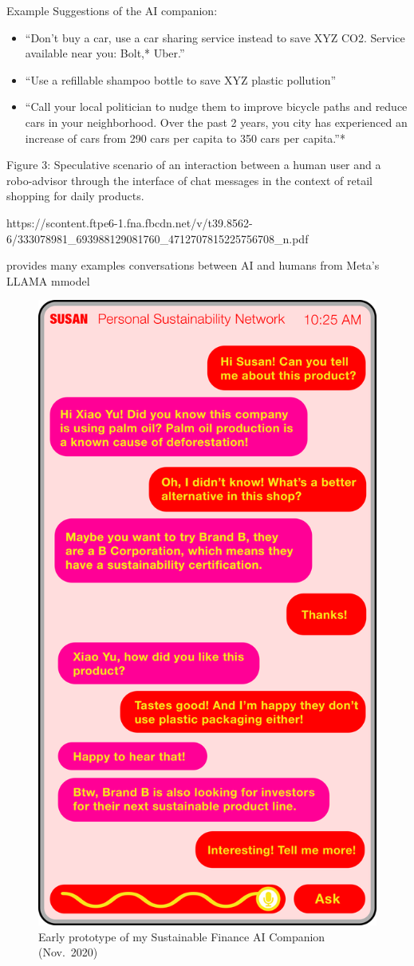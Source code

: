 \documentclass[
  letterpaper,
  DIV=11,
  numbers=noendperiod]{scrartcl}
\begin{document}
Example Suggestions of the AI companion:

\begin{itemize}
\item
  ``Don't buy a car, use a car sharing service instead to save XYZ CO2.
  Service available near you: Bolt,* Uber.''
\item
  ``Use a refillable shampoo bottle to save XYZ plastic pollution''
\item
  ``Call your local politician to nudge them to improve bicycle paths
  and reduce cars in your neighborhood. Over the past 2 years, you city
  has experienced an increase of cars from 290 cars per capita to 350
  cars per capita.''*
\end{itemize}

Figure 3: Speculative scenario of an interaction between a human user
and a robo-advisor through the interface of chat messages in the context
of retail shopping for daily products.

https://scontent.ftpe6-1.fna.fbcdn.net/v/t39.8562-6/333078981\_693988129081760\_4712707815225756708\_n.pdf

provides many examples conversations between AI and humans from Meta's
LLAMA mmodel

\begin{figure}[H]

{\centering \includegraphics[width=0.5\linewidth,height=\textheight,keepaspectratio]{./images/prototypes/susan-pink-app.png}

}

\caption{Early prototype of my Sustainable Finance AI Companion
(Nov.~2020)}

\end{figure}%
\end{document}

